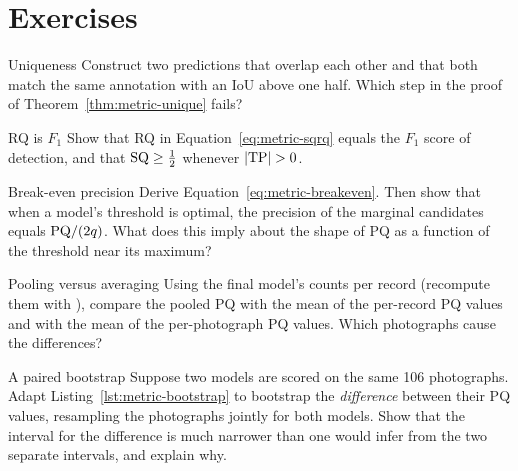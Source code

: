 \section*{Exercises}
\begin{exercise}{Uniqueness}
Construct two predictions that overlap each other and that both match the same annotation with an
IoU above one half. Which step in the proof of Theorem~\ref{thm:metric-unique} fails?
\end{exercise}

\begin{exercise}{RQ is $F_1$}
Show that RQ in Equation~\eqref{eq:metric-sqrq} equals the $F_1$ score of detection, and that
$\mathrm{SQ}\ge\tfrac12$ whenever $|\TP|>0$.
\end{exercise}

\begin{exercise}{Break-even precision}
Derive Equation~\eqref{eq:metric-breakeven}. Then show that when a model's threshold is optimal,
the precision of the marginal candidates equals $\mathrm{PQ}/(2q)$. What does this imply about the shape of
PQ as a function of the threshold near its maximum?
\end{exercise}

\begin{exercise}{Pooling versus averaging}
Using the final model's counts per record (recompute them with
), compare the pooled PQ with the mean of the per-record
PQ values and with the mean of the per-photograph PQ values. Which photographs cause the
differences?
\end{exercise}

\begin{exercise}{A paired bootstrap}\label{ex:metric-paired}
Suppose two models are scored on the same 106 photographs. Adapt Listing~\ref{lst:metric-bootstrap}
to bootstrap the \emph{difference} between their PQ values, resampling the photographs jointly for
both models. Show that the interval for the difference is much narrower than one would infer from
the two separate intervals, and explain why.
\end{exercise}

